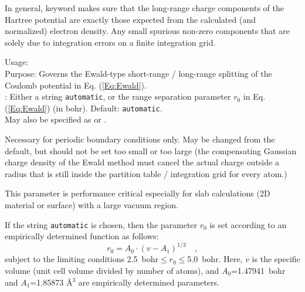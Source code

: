 In general, keyword  makes sure that the
long-range charge components of the Hartree potential are exactly those expected 
from the calculated (and normalized) electron density. Any small spurious non-zero
components that are solely due to integration errors on a finite integration grid.


{
  \noindent
  Usage:  
    \\[1.0ex]
  Purpose: Governs the Ewald-type short-range / long-range splitting
    of the Coulomb potential in Eq. (\ref{Eq:Ewald}). \\[1.0ex]
   : Either a string \texttt{automatic}, or the 
    range separation parameter $r_0$ in Eq. (\ref{Eq:Ewald})
    (in bohr). Default: \texttt{automatic}. \\
}
May also be specified as  or
.

Necessary for periodic boundary conditions only. May be changed from
the default, but should not be set too small or too large (the compensating
Gaussian charge density of the Ewald method must cancel the actual charge
outside a radius that is still inside the partition table / integration 
grid for every atom.) 

This parameter is performance critical especially for slab
calculations (2D material or surface) with a large vacuum region.

If the string \texttt{automatic} is chosen, then the parameter $r_0$ is
set according to an empirically determined function as follows:
\begin{equation}
  r_0 = A_0 \cdot (v - A_1)^{1/3} \quad ,
\end{equation}
subject to the limiting conditions 2.5~bohr$\le r_0 \le$5.0~bohr. 
Here, $v$ is the specific volume (unit cell volume divided by number of atoms),
and $A_0$=1.47941~bohr and $A_1$=1.85873 {\AA}$^3$ are empirically determined
parameters. 

